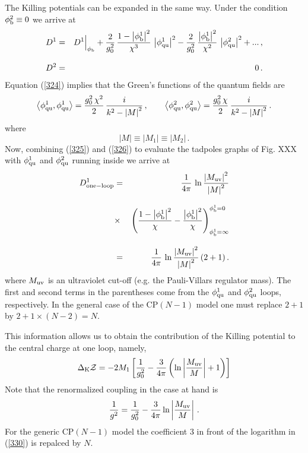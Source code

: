 \documentclass[epsfig,12pt]{article}
\def\beq{\begin{equation}}
\def\eeq{\end{equation}}
\def\beq{\begin{equation}}
\def\eeq{\end{equation}}
\begin{document}
The Killing potentials can be expanded in the same way. Under the condition $\phi^2_{\rm b}\equiv 0$ 
we arrive at
\begin{eqnarray}
D^1
&=&
 D^1\Big|_{\phi_{\rm b}} + \frac{2}{g_0^2}\, \frac{1-\left| \phi^1_{\rm b}
\right|^2}{\chi^3}\, \left|  \phi^1_{\rm qu}\right|^2 
- \frac{2}{g_0^2}\, \frac{\left| \phi^1_{\rm b}
\right|^2}{\chi^2}\, \left|  \phi^2_{\rm qu}\right|^2 + ...\,,
\nonumber\\[3mm]
D^2
&=&
0\,.
\label{325}
\end{eqnarray}
Equation (\ref{324})
implies that the Green's functions of the quantum fields are
\beq
\left\langle \phi^1_{\rm qu}, \phi^1_{\rm qu}\right\rangle = \frac{g_0^2\,\chi^2 }{2}\, \frac{i}{k^2-\left|M\right|^2}\,,\qquad
\left\langle \phi^2_{\rm qu}, \phi^2_{\rm qu}\right\rangle = \frac{g_0^2\,\chi }{2 }\, \frac{i}{k^2-\left|M\right|^2}\,.
\label{326}
\eeq
where 
\beq
\left|M\right|\equiv \left|M_1\right|\equiv \left|M_2\right|\,.
\eeq
Now, combining (\ref{325}) and (\ref{326}) to evaluate the tadpoles graphs of Fig. XXX
with $\phi^1_{\rm qu}$ and $\phi^2_{\rm qu}$ running inside
we arrive at
\begin{eqnarray}
D^1_{\rm one-loop} 
&=&
 \frac{1}{4\pi}\, \ln \frac{\left| M_{\rm uv}\right|^2}{\left|M\right|^2}
 \nonumber\\[3mm]
 &\times&
 \left( \frac{1-\left| \phi^1_{\rm b}
\right|^2}{\chi} - \frac{\left| \phi^1_{\rm b}
\right|^2}{\chi}
 \right)^{\phi_{\rm b}^{1}=0}_{\phi_{\rm b}^{1}=\infty}
  \nonumber\\[3mm]
  &=&
  \frac{1}{4\pi}\, \ln \frac{\left| M_{\rm uv}\right|^2}{\left|M\right|^2}
  \left(2 + 1
  \right).
\end{eqnarray}
where $M_{\rm uv}$ is an ultraviolet cut-off (e.g. the Pauli-Villars regulator mass). The first and second terms in the parentheses come from the $\phi^1_{\rm qu}$ and $\phi^2_{\rm qu}$ loops, respectively. In the general case of the CP$(N-1)$ model
one must replace $2+1$ by $2+ 1\times (N-2) = N$.

This information allows us to obtain the contribution of the Killing potential to the central charge at one loop, namely,
\beq
\Delta_{\rm K}{\mathcal Z} = -2M_1\left[\frac{1}{g_0^2} -
\frac{3}{4\pi} \left(\ln\left|\frac{M_{\rm uv}}{M} 
\right| +1
\right)
\right]
\label{329}
\eeq
Note that the renormalized coupling in the case at hand is \cite{Novikov:1984ac}
\beq
\frac{1}{g^2}=
\frac{1}{g_0^2} -
\frac{3}{4\pi}  \ln\left|\frac{M_{\rm uv}}{M} \right |\,.
\label{330}
\eeq
For the generic CP$(N-1)$ model the coefficient 3 in front of the logarithm 
in (\ref{330}) is
repalced by $N$.
\end{document}
